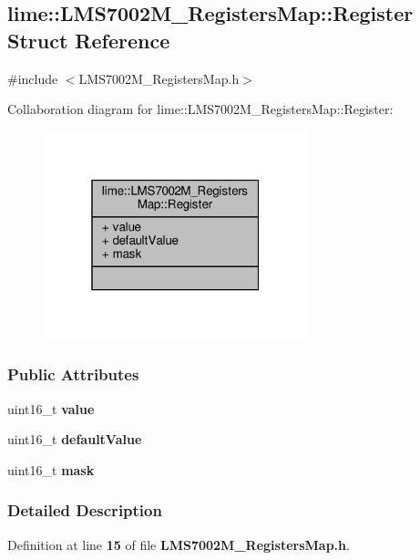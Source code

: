 \subsection{lime\+:\+:L\+M\+S7002\+M\+\_\+\+Registers\+Map\+:\+:Register Struct Reference}
\label{structlime_1_1LMS7002M__RegistersMap_1_1Register}


{\ttfamily \#include $<$L\+M\+S7002\+M\+\_\+\+Registers\+Map.\+h$>$}



Collaboration diagram for lime\+:\+:L\+M\+S7002\+M\+\_\+\+Registers\+Map\+:\+:Register\+:
\nopagebreak
\begin{figure}[H]
\begin{center}
\leavevmode
\includegraphics[width=217pt]{d8/db8/structlime_1_1LMS7002M__RegistersMap_1_1Register__coll__graph}
\end{center}
\end{figure}
\subsubsection*{Public Attributes}
\begin{DoxyCompactItemize}
\item 
uint16\+\_\+t {\bf value}
\item 
uint16\+\_\+t {\bf default\+Value}
\item 
uint16\+\_\+t {\bf mask}
\end{DoxyCompactItemize}


\subsubsection{Detailed Description}


Definition at line {\bf 15} of file {\bf L\+M\+S7002\+M\+\_\+\+Registers\+Map.\+h}.



